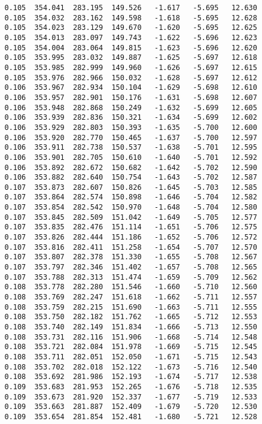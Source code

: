 \begin{verbatim}
   0.105  354.041  283.195  149.526   -1.617   -5.695   12.630
   0.105  354.032  283.162  149.598   -1.618   -5.695   12.628
   0.105  354.023  283.129  149.670   -1.620   -5.695   12.625
   0.105  354.013  283.097  149.743   -1.622   -5.696   12.623
   0.105  354.004  283.064  149.815   -1.623   -5.696   12.620
   0.105  353.995  283.032  149.887   -1.625   -5.697   12.618
   0.105  353.985  282.999  149.960   -1.626   -5.697   12.615
   0.105  353.976  282.966  150.032   -1.628   -5.697   12.612
   0.106  353.967  282.934  150.104   -1.629   -5.698   12.610
   0.106  353.957  282.901  150.176   -1.631   -5.698   12.607
   0.106  353.948  282.868  150.249   -1.632   -5.699   12.605
   0.106  353.939  282.836  150.321   -1.634   -5.699   12.602
   0.106  353.929  282.803  150.393   -1.635   -5.700   12.600
   0.106  353.920  282.770  150.465   -1.637   -5.700   12.597
   0.106  353.911  282.738  150.537   -1.638   -5.701   12.595
   0.106  353.901  282.705  150.610   -1.640   -5.701   12.592
   0.106  353.892  282.672  150.682   -1.642   -5.702   12.590
   0.106  353.882  282.640  150.754   -1.643   -5.702   12.587
   0.107  353.873  282.607  150.826   -1.645   -5.703   12.585
   0.107  353.864  282.574  150.898   -1.646   -5.704   12.582
   0.107  353.854  282.542  150.970   -1.648   -5.704   12.580
   0.107  353.845  282.509  151.042   -1.649   -5.705   12.577
   0.107  353.835  282.476  151.114   -1.651   -5.706   12.575
   0.107  353.826  282.444  151.186   -1.652   -5.706   12.572
   0.107  353.816  282.411  151.258   -1.654   -5.707   12.570
   0.107  353.807  282.378  151.330   -1.655   -5.708   12.567
   0.107  353.797  282.346  151.402   -1.657   -5.708   12.565
   0.107  353.788  282.313  151.474   -1.659   -5.709   12.562
   0.108  353.778  282.280  151.546   -1.660   -5.710   12.560
   0.108  353.769  282.247  151.618   -1.662   -5.711   12.557
   0.108  353.759  282.215  151.690   -1.663   -5.711   12.555
   0.108  353.750  282.182  151.762   -1.665   -5.712   12.553
   0.108  353.740  282.149  151.834   -1.666   -5.713   12.550
   0.108  353.731  282.116  151.906   -1.668   -5.714   12.548
   0.108  353.721  282.084  151.978   -1.669   -5.715   12.545
   0.108  353.711  282.051  152.050   -1.671   -5.715   12.543
   0.108  353.702  282.018  152.122   -1.673   -5.716   12.540
   0.108  353.692  281.986  152.193   -1.674   -5.717   12.538
   0.109  353.683  281.953  152.265   -1.676   -5.718   12.535
   0.109  353.673  281.920  152.337   -1.677   -5.719   12.533
   0.109  353.663  281.887  152.409   -1.679   -5.720   12.530
   0.109  353.654  281.854  152.481   -1.680   -5.721   12.528

\end{verbatim}

